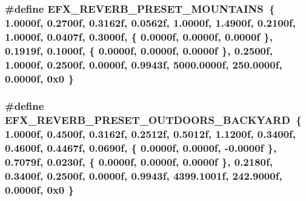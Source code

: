 \subsubsection[{\texorpdfstring{E\+F\+X\+\_\+\+R\+E\+V\+E\+R\+B\+\_\+\+P\+R\+E\+S\+E\+T\+\_\+\+M\+O\+U\+N\+T\+A\+I\+NS}{EFX_REVERB_PRESET_MOUNTAINS}}]{\setlength{\rightskip}{0pt plus 5cm}\#define E\+F\+X\+\_\+\+R\+E\+V\+E\+R\+B\+\_\+\+P\+R\+E\+S\+E\+T\+\_\+\+M\+O\+U\+N\+T\+A\+I\+NS~\{ 1.\+0000f, 0.\+2700f, 0.\+3162f, 0.\+0562f, 1.\+0000f, 1.\+4900f, 0.\+2100f, 1.\+0000f, 0.\+0407f, 0.\+3000f, \{ 0.\+0000f, 0.\+0000f, 0.\+0000f \}, 0.\+1919f, 0.\+1000f, \{ 0.\+0000f, 0.\+0000f, 0.\+0000f \}, 0.\+2500f, 1.\+0000f, 0.\+2500f, 0.\+0000f, 0.\+9943f, 5000.\+0000f, 250.\+0000f, 0.\+0000f, 0x0 \}}\hypertarget{efx-presets_8h_a01a4fbb51046564e360a027fb499f26e}{}\label{efx-presets_8h_a01a4fbb51046564e360a027fb499f26e}
\subsubsection[{\texorpdfstring{E\+F\+X\+\_\+\+R\+E\+V\+E\+R\+B\+\_\+\+P\+R\+E\+S\+E\+T\+\_\+\+O\+U\+T\+D\+O\+O\+R\+S\+\_\+\+B\+A\+C\+K\+Y\+A\+RD}{EFX_REVERB_PRESET_OUTDOORS_BACKYARD}}]{\setlength{\rightskip}{0pt plus 5cm}\#define E\+F\+X\+\_\+\+R\+E\+V\+E\+R\+B\+\_\+\+P\+R\+E\+S\+E\+T\+\_\+\+O\+U\+T\+D\+O\+O\+R\+S\+\_\+\+B\+A\+C\+K\+Y\+A\+RD~\{ 1.\+0000f, 0.\+4500f, 0.\+3162f, 0.\+2512f, 0.\+5012f, 1.\+1200f, 0.\+3400f, 0.\+4600f, 0.\+4467f, 0.\+0690f, \{ 0.\+0000f, 0.\+0000f, -\/0.\+0000f \}, 0.\+7079f, 0.\+0230f, \{ 0.\+0000f, 0.\+0000f, 0.\+0000f \}, 0.\+2180f, 0.\+3400f, 0.\+2500f, 0.\+0000f, 0.\+9943f, 4399.\+1001f, 242.\+9000f, 0.\+0000f, 0x0 \}}\hypertarget{efx-presets_8h_ae4405742339af8a203fa3d6762b4dd0a}{}\label{efx-presets_8h_ae4405742339af8a203fa3d6762b4dd0a}
